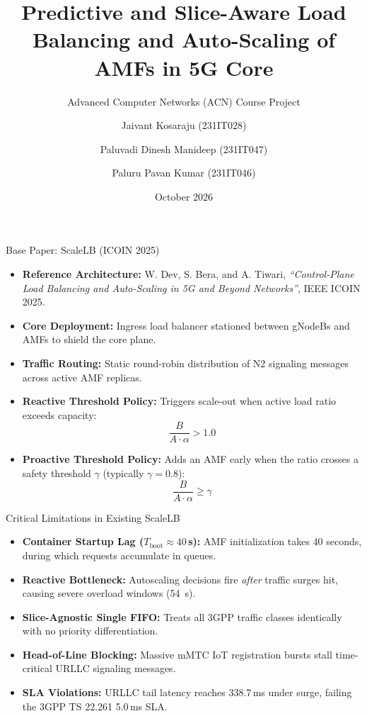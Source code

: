 \documentclass[aspectratio=169,11pt]{beamer}
\title[Predictive \& Slice-Aware 5G AMF Autoscaling]{Predictive and Slice-Aware Load Balancing and Auto-Scaling of AMFs in 5G Core}
\subtitle{Advanced Computer Networks (ACN) Course Project}
\author[Kosaraju, Paluvadi, Paluru]{Jaivant Kosaraju (231IT028) \and Paluvadi Dinesh Manideep (231IT047) \and Paluru Pavan Kumar (231IT046)}
\institute[NITK Surathkal]{Department of Information Technology \\ National Institute of Technology Karnataka, Surathkal}
\date{October 2026}
\begin{document}
\begin{frame}
  \titlepage
\end{frame}

\begin{frame}{Base Paper: ScaleLB (ICOIN 2025)}
  \begin{itemize}
    \setlength\itemsep{0.5em}
    \item \textbf{Reference Architecture:} W. Dev, S. Bera, and A. Tiwari, \emph{``Control-Plane Load Balancing and Auto-Scaling in 5G and Beyond Networks''}, IEEE ICOIN 2025.
    \item \textbf{Core Deployment:} Ingress load balancer stationed between gNodeBs and AMFs to shield the core plane.
    \item \textbf{Traffic Routing:} Static round-robin distribution of N2 signaling messages across active AMF replicas.
    \item \textbf{Reactive Threshold Policy:} Triggers scale-out when active load ratio exceeds capacity:
      \[ \frac{B}{A \cdot \alpha} > 1.0 \]
    \item \textbf{Proactive Threshold Policy:} Adds an AMF early when the ratio crosses a safety threshold $\gamma$ (typically $\gamma = 0.8$):
      \[ \frac{B}{A \cdot \alpha} \ge \gamma \]
  \end{itemize}
\end{frame}

\begin{frame}{Critical Limitations in Existing ScaleLB}
  \begin{itemize}
    \setlength\itemsep{1.1em}
    \item \textbf{Container Startup Lag ($T_{\text{boot}} \approx 40$\,s):} AMF initialization takes 40 seconds, during which requests accumulate in queues.
    \item \textbf{Reactive Bottleneck:} Autoscaling decisions fire \emph{after} traffic surges hit, causing severe overload windows (54~s).
    \item \textbf{Slice-Agnostic Single FIFO:} Treats all 3GPP traffic classes identically with no priority differentiation.
    \item \textbf{Head-of-Line Blocking:} Massive mMTC IoT registration bursts stall time-critical URLLC signaling messages.
    \item \textbf{SLA Violations:} URLLC tail latency reaches 338.7\,ms under surge, failing the 3GPP TS 22.261 5.0\,ms SLA.
  \end{itemize}
\end{frame}
\end{document}
